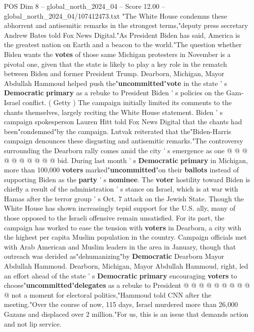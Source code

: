 \begin{textsample}{POS Dim 8 – global\_north\_2024\_04 – Score 12.00 – global\_north\_2024\_04/107412473.txt}  \label{ex:f8_pos_055}
"The White House condemns these abhorrent and antisemitic remarks in the strongest terms,"deputy press secretary Andrew Bates told Fox News Digital."As President Biden has said, America is the greatest nation on Earth and a beacon to the world."The question whether Biden wants the \textbf{votes} of those same Michigan protesters in November is a pivotal one, given that the state is likely to play a key role in the rematch between Biden and former President Trump.
Dearborn, Michigan, Mayor Abdullah Hammoud helped push the"\textbf{uncommitted}"\textbf{vote} in the state ' s \textbf{Democratic} \textbf{primary} as a rebuke to President Biden ' s policies on the Gaza-Israel conflict. ( Getty ) The campaign initially limited its comments to the chants themselves, largely reciting the White House statement.
Biden ' s campaign spokesperson Lauren Hitt told Fox News Digital that the chants had been"condemned"by the campaign.
Lutvak reiterated that the"Biden-Harris campaign denounces these disgusting and antisemitic remarks."The controversy surrounding the Dearborn rally comes amid the city ' s emergence as one @ @ @ @ @ @ @ @ @ @ bid.
During last month ' s \textbf{Democratic} \textbf{primary} in Michigan, more than 100,000 \textbf{voters} marked"\textbf{uncommitted}"on their \textbf{ballots} instead of supporting Biden as the \textbf{party} ' s \textbf{nominee}.
The \textbf{voter} hostility toward Biden is chiefly a result of the administration ' s stance on Israel, which is at war with Hamas after the terror group ' s Oct. 7 attack on the Jewish State.
Though the White House has shown increasingly tepid support for the U.S. ally, many of those opposed to the Israeli offensive remain unsatisfied.
For its part, the campaign has worked to ease the tension with \textbf{voters} in Dearborn, a city with the highest per capita Muslim population in the country.
Campaign officials met with Arab American and Muslim leaders in the area in January, though that outreach was derided as"dehumanizing"by \textbf{Democratic} Dearborn Mayor Abdullah Hammoud.
Dearborn, Michigan, Mayor Abdullah Hammoud, right, led an effort ahead of the state ' s \textbf{Democratic} \textbf{primary} encouraging \textbf{voters} to choose"\textbf{uncommitted}"\textbf{delegates} as a rebuke to President @ @ @ @ @ @ @ @ @ @ not a moment for electoral politics,"Hammoud told CNN after the meeting."Over the course of now, 115 days, Israel murdered more than 26,000 Gazans and displaced over 2 million."For us, this is an issue that demands action and not lip service.

\end{textsample}

